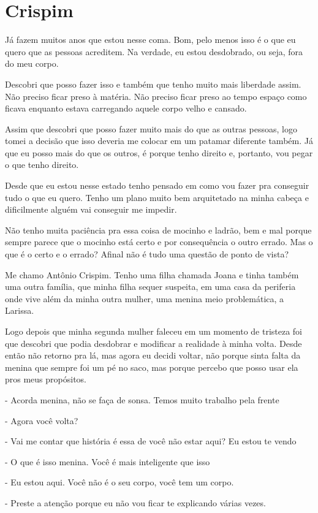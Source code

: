 \chapter{Crispim}
Já fazem muitos anos que estou nesse coma. Bom, pelo menos isso é o que eu quero que as pessoas acreditem. Na verdade, eu estou desdobrado, ou seja, fora do meu corpo.

Descobri que posso fazer isso e também que tenho muito mais liberdade assim. Não preciso ficar preso à matéria. Não preciso ficar preso ao tempo espaço como ficava enquanto estava carregando aquele corpo velho e cansado.

Assim que descobri que posso fazer muito mais do que as outras pessoas, logo tomei a decisão que isso deveria me colocar em um patamar diferente também. Já que eu posso mais do que os outros, é porque tenho direito e, portanto, vou pegar o que tenho direito.

Desde que eu estou nesse estado tenho pensado em como vou fazer pra conseguir tudo o que eu quero. Tenho um plano muito bem arquitetado na minha cabeça e dificilmente alguém vai conseguir me impedir. 

Não tenho muita paciência pra essa coisa de mocinho e ladrão, bem e mal porque sempre parece que o mocinho está certo e por consequência o outro errado. Mas o que é o certo e o errado? Afinal não é tudo uma questão de ponto de vista?

Me chamo Antônio Crispim. Tenho uma filha chamada Joana e tinha também uma outra família, que minha filha sequer suspeita, em uma casa da periferia onde vive além da minha outra mulher, uma menina meio problemática, a Larissa. 

Logo depois que minha segunda mulher faleceu em um momento de tristeza foi que descobri que podia desdobrar e modificar a realidade à minha volta. Desde então não retorno pra lá, mas agora eu decidi voltar, não porque sinta falta da menina que sempre foi um pé no saco, mas porque percebo que posso usar ela pros meus propósitos.

- Acorda menina, não se faça de sonsa. Temos muito trabalho pela frente

- Agora você volta?

- Vai me contar que história é essa de você não estar aqui? Eu estou te vendo

- O que é isso menina. Você é mais inteligente que isso

- Eu estou aqui. Você não é o seu corpo, você tem um corpo.

- Preste a atenção porque eu não vou ficar te explicando várias vezes.

